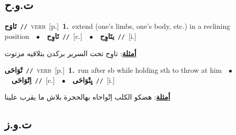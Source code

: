 \documentclass[10pt,a4paper,twoside]{article} %
\begin{document}
\begin{multicols}{2}
\vspace{-3mm}
\subsection*{\color{blue}\foreignlanguage{arabic}{ت.و.ح}\color{blue}{}} 

{\setlength\topsep{0pt}\textbf{\foreignlanguage{arabic}{تَاوَح}}\ {\color{gray}\texttt{//}\color{black}}\ \textsc{verb}\ [p.]\ \textbf{1.}~extend (one's limbs, one's body, etc.) in a reclining position\ \ $\bullet$\ \ \setlength\topsep{0pt}\textbf{\foreignlanguage{arabic}{تَاوِح}}\ {\color{gray}\texttt{//}\color{black}}\ [c.]\ \ $\bullet$\ \ \setlength\topsep{0pt}\textbf{\foreignlanguage{arabic}{يتَاوِح}}\ {\color{gray}\texttt{//}\color{black}}\ [i.]\  \begin{flushright}\color{gray}\foreignlanguage{arabic}{\textbf{\underline{\foreignlanguage{arabic}{أمثلة}}}: تاوِح تحت السرير بركدن بتلاقيه مزتوت}\end{flushright}\color{black}} \vspace{2mm}

{\setlength\topsep{0pt}\textbf{\foreignlanguage{arabic}{تْوَاحَى}}\ {\color{gray}\texttt{//}\color{black}}\ \textsc{verb}\ [p.]\ \textbf{1.}~run after sb while holding sth to throw at him\ \ $\bullet$\ \ \setlength\topsep{0pt}\textbf{\foreignlanguage{arabic}{اِتْوَاحَى}}\ {\color{gray}\texttt{//}\color{black}}\ [c.]\ \ $\bullet$\ \ \setlength\topsep{0pt}\textbf{\foreignlanguage{arabic}{يِتْوَاحَى}}\ {\color{gray}\texttt{//}\color{black}}\ [i.]\  \begin{flushright}\color{gray}\foreignlanguage{arabic}{\textbf{\underline{\foreignlanguage{arabic}{أمثلة}}}: هضكو الكلب اِتْواحاه بهالحجرة بلاش ما يقرب علينا}\end{flushright}\color{black}} \vspace{2mm}

\vspace{-3mm}
\subsection*{\color{blue}\foreignlanguage{arabic}{ت.و.ز}\color{blue}{}} 


\end{multicols}
\end{document}
